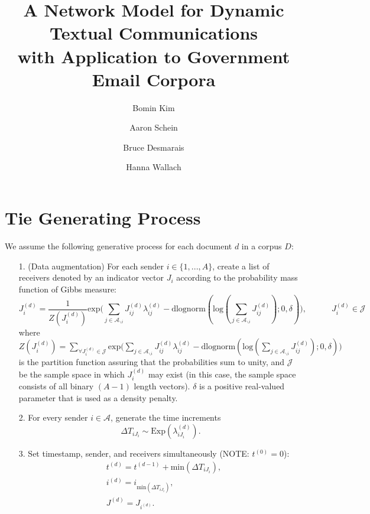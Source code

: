 \documentclass[a4paper]{article}
\title{A Network Model for Dynamic Textual Communications \\with Application to
	Government Email Corpora}
\author[1]{Bomin Kim}
\author[3]{Aaron Schein}
\author[1]{Bruce Desmarais}
\author[2,3]{Hanna Wallach}
\affil[1]{Pennsylvania State University}
\affil[2]{Microsoft Research NYC}
\affil[3]{University of Massachusetts Amherst}
\begin{document}
\maketitle
\section{Tie Generating Process}\label{subsec: Tie Generating Process}
We assume the following generative process for each document $d$ in a corpus $D$:
\begin{itemize}
	\item[1.] (Data augmentation) For each sender $i \in \{1,...,A\}$, create a list of receivers denoted by  an indicator vector $J_i$ according to the probability mass function of Gibbs measure:
	\begin{equation}J^{(d)}_{i} = \frac{1}{Z(J^{(d)}_i)}\mbox{exp}\Big(\sum_{j \in \mathcal{A}_{\backslash i}}J^{(d)}_{ij}\lambda^{(d)}_{ij} - \mbox{dlognorm}(\mbox{log}(\sum\limits_{j \in \mathcal{A}_{\backslash i}}J^{(d)}_{ij});0, \delta)\Big), \quad\quad\quad J^{(d)}_{i} \in \mathcal{J}
	\end{equation}
	where $Z(J^{(d)}_i) = \sum\limits_{\forall J^{(d)}_i \in \mathcal{J}}\mbox{exp}\Big(\sum_{j \in \mathcal{A}_{\backslash i}}J^{(d)}_{ij}\lambda^{(d)}_{ij} - \mbox{dlognorm}(\mbox{log}(\sum\limits_{j \in \mathcal{A}_{\backslash i}}J^{(d)}_{ij});0, \delta)\Big)$ is the partition function assuring that the probabilities sum to unity, and $\mathcal{J}$ be the sample space in which $J^{(d)}_i$ may exist (in this case, the sample space consists of all binary $(A-1)$ length vectors). $\delta$ is a positive real-valued parameter that is used as a density penalty.
	\item[2.] For every sender $i \in \mathcal{A}$, generate the time increments \begin{equation}
	\Delta T_{i{J_i}} \sim \mbox{Exp}(\lambda_{i{J_i}}^{(d)}).
	\end{equation}
	\item[3.] Set timestamp, sender, and receivers simultaneously (NOTE: $t^{(0)}=0$):
	\begin{equation}
	\begin{aligned}
	&t^{(d)} = t^{(d-1)}+\mbox{min}(\Delta T_{i{J_i}}),\\
	&i^{(d)} = i_{\mbox{min}(\Delta T_{i{J_i}})}, \\
	&J^{(d)} = J_{i^{(d)}}.
	\end{aligned}
	\end{equation}
\end{itemize}
\end{document}
